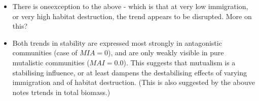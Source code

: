 \begin{itemize}
	\item There is oneexception to the above - which is that at very low immigration, or very high habitat destruction, the trend appears to be disrupted. More on this? 
	
	\item Both trends in stability are expressed most strongly in antagonistic communities (case of $MIA=0$), and are only weakly visible in pure mutalistic communities ($MAI=0.0$). This suggests that mutualism is a stabilising influence, or at least dampens the destabilising effects of varying immigration and of habitat destruction. (This is also suggested by the abouve notes trtends in total biomass.)
	
\end{itemize}



\clearpage
{}

